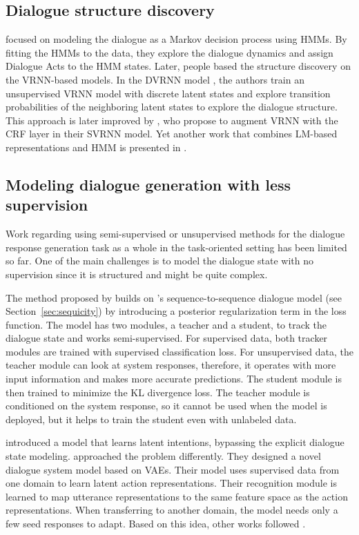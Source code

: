 \subsection{Dialogue structure discovery}
\citet{brychcin2016unsupervised} focused on modeling the dialogue as a Markov decision process using HMMs.
By fitting the HMMs to the data, they explore the dialogue dynamics and assign Dialogue Acts to the HMM states.
Later, people based the structure discovery on the VRNN-based models.
In the DVRNN model \cite{shi2019unsupervised}, the authors train an unsupervised VRNN model with discrete latent states and explore transition probabilities of the neighboring latent states to explore the dialogue structure.
This approach is later improved by \citet{qiu-etal-2020-structured}, who propose to augment VRNN with the CRF layer in their SVRNN model.
Yet another work that combines LM-based representations and HMM is presented in \citet{lu-etal-2022-unsupervised}.

\subsection{Modeling dialogue generation with less supervision}
Work regarding using semi-supervised or unsupervised methods for the dialogue response generation task as a whole in the task-oriented setting has been limited so far.
One of the main challenges is to model the dialogue state with no supervision since it is structured and might be quite complex.

The method proposed by \citet{jin2018explicit} builds on \citet{lei2018sequicity}'s sequence-to-sequence dialogue model (see Section~\ref{sec:sequicity}) by introducing a posterior regularization term in the loss function.
The model has two modules, a teacher and a student, to track the dialogue state and works semi-supervised.
For supervised data, both tracker modules are trained with supervised classification loss.
For unsupervised data, the teacher module can look at system responses, therefore, it operates with more input information and makes more accurate predictions.
The student module is then trained to minimize the KL divergence loss.
The teacher module is conditioned on the system response, so it cannot be used when the model is deployed, but it helps to train the student even with unlabeled data.

\citet{wen2017latent} introduced a model that learns latent intentions, bypassing the explicit dialogue state modeling.
\citet{zhao-eskenazi-2018-zero} approached the problem differently.
They designed a novel dialogue system model based on VAEs.
Their model uses supervised data from one domain to learn latent action representations.
Their recognition module is learned to map utterance representations to the same feature space as the action representations.
When transferring to another domain, the model needs only a few seed responses to adapt.
Based on this idea, other works followed \citep{shalyminov-etal-2019-shot, huang2019mala}.

